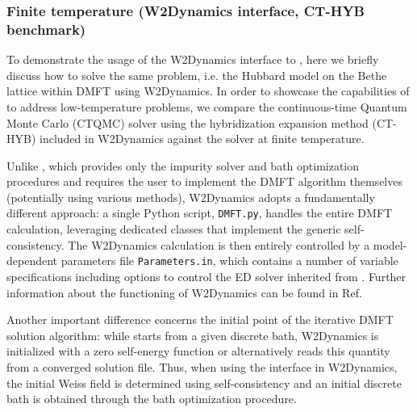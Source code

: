 \documentclass[edipack_sp.tex]{subfiles}
\begin{document}
\subsubsection{Finite temperature (W2Dynamics interface, CT-HYB benchmark)}\label{SecExamplesBetheDMFTW2D}
To demonstrate the usage of the W2Dynamics interface to \NAME,  here we briefly discuss how to solve the same problem, i.e. the Hubbard model on the Bethe lattice within DMFT using W2Dynamics. 
In order to showcase the capabilities of \NAME to address low-temperature problems, we compare the continuous-time Quantum Monte Carlo (CTQMC) solver using the hybridization expansion method (CT-HYB) included in W2Dynamics against the \NAME solver at finite temperature.  

Unlike \NAME, which provides only the impurity solver and bath optimization procedures and requires the user to implement the DMFT algorithm themselves (potentially using various methods), W2Dynamics adopts a fundamentally different approach: a single Python script, {\tt DMFT.py}, handles the entire DMFT calculation, leveraging dedicated classes that implement the generic self-consistency. The W2Dynamics calculation is then entirely controlled by a model-dependent parameters file {\tt Parameters.in}, which contains a number of variable specifications including options to control the ED solver inherited from \NAME. Further information about the functioning of W2Dynamics can be found in Ref.~\cite{Wallerberger2019CPC}           

Another important difference concerns the initial point of the iterative DMFT solution algorithm: while \NAME starts from a given discrete bath, W2Dynamics is initialized with a zero self-energy function or alternatively reads this quantity from a converged solution file. Thus, when using the \NAME interface in W2Dynamics, the initial Weiss field is determined using self-consistency and  an initial discrete bath is obtained through the \NAME bath optimization procedure. 
\end{document}
